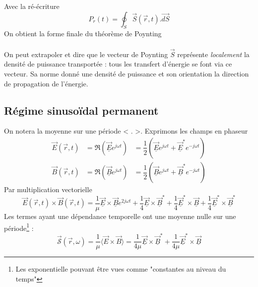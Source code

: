 	Avec la ré-écriture
	\begin{equation}
	P_r(t) = \oint_S \vec{S}(\vec{r},t).\vec{dS}
	\end{equation}
	On obtient la forme finale du théorème de Poynting \\
	\ \\
	
	On peut extrapoler et dire que le vecteur de Poynting $\vec{S}$ représente \textit{localement} 
	la densité de puissance transportée : tous les transfert d'énergie se font via ce vecteur. Sa 
	norme donné une densité de puissance et son orientation la direction de propagation de l'énergie. 
	
	
	\subsection{Régime sinusoïdal permanent}
	On notera la moyenne sur une période < . >. Exprimons les champs en phaseur
	\begin{equation}
	\begin{array}{lll}
	\vec{E}(\vec{r},t) &= \Re\left(\underline{\vec{E}}e^{j\omega t}\right) &= \dfrac{1}{2}\left(
	\underline{\vec{E}}e^{j\omega t}+\underline{\vec{E}}^*e^{-j\omega t}\right)\\
	\vec{B}(\vec{r},t) &= \Re\left(\underline{\vec{B}}e^{j\omega t}\right) &= \dfrac{1}{2}\left(
	\underline{\vec{B}}e^{j\omega t}+\underline{\vec{B}}^*e^{-j\omega t}\right)
	\end{array}
	\end{equation}
	Par multiplication vectorielle
	\begin{equation}
	\vec{E}(\vec{r},t)\times\vec{B}(\vec{r},t) = \frac{1}{\mu}\underline{\vec{E}}\times\underline{
	\vec{B}}e^{2j\omega t} +\frac{1}{4}\underline{\vec{E}}\times\underline{\vec{B}}^* + \frac{1}{4}
	\underline{\vec{E}}^*\times\underline{\vec{B}}+\frac{1}{4}
	\underline{\vec{E}}^*\times\underline{\vec{B}}^*
	\end{equation}
	Les termes ayant une dépendance temporelle ont une moyenne nulle sur une période\footnote{Les 
	exponentielle pouvant être vues comme "constantes au niveau du temps"} :
	\begin{equation}
	\vec{\mathcal{S}}(\vec{r},\omega) = \frac{1}{\mu}\langle\vec{E}\times\vec{B}\rangle 
	=\dfrac{1}{4\mu}\underline{\vec{E}}\times\underline{\vec{B}}^* + \frac{1}{4\mu}
	\underline{\vec{E}}^*\times\underline{\vec{B}}
	\end{equation}
	
